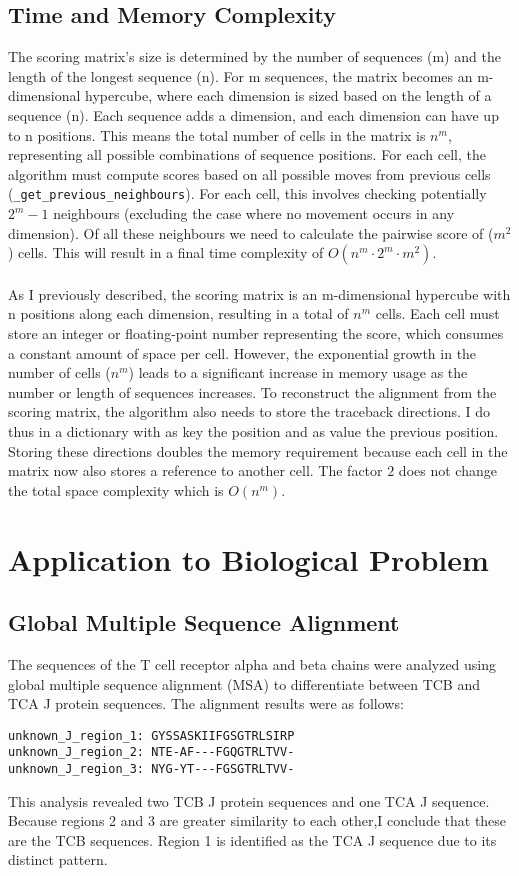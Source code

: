 \documentclass{article}
\begin{document}
\subsection{Time and Memory Complexity}

The scoring matrix's size is determined by the number of sequences (m) and the length of the longest sequence (n). For m sequences, the matrix becomes an m-dimensional hypercube, where each dimension is sized based on the length of a sequence (n). Each sequence adds a dimension, and each dimension can have up to n positions. This means the total number of cells in the matrix is $n^m$, representing all possible combinations of sequence positions. For each cell, the algorithm must compute scores based on all possible moves from previous cells (\texttt{\_get\_previous\_neighbours}). For each cell, this involves checking potentially $2^m-1$ neighbours (excluding the case where no movement occurs in any dimension). Of all these neighbours we need to calculate the pairwise score of ($m^2$) cells. This will result in a final time complexity of $O(n^m \cdot 2^m \cdot m^2)$.\\
\\
As I previously described, the scoring matrix is an m-dimensional hypercube with n positions along each dimension, resulting in a total of $n^m$ cells. Each cell must store an integer or floating-point number representing the score, which consumes a constant amount of space per cell. However, the exponential growth in the number of cells ($n^m$) leads to a significant increase in memory usage as the number or length of sequences increases. To reconstruct the alignment from the scoring matrix, the algorithm also needs to store the traceback directions. I do thus in a dictionary with as key the position and as value the previous position. Storing these directions doubles the memory requirement because each cell in the matrix now also stores a reference to another cell. The factor $2$ does not change the total space complexity which is $O(n^m)$.
\section{Application to Biological Problem}
\subsection{Global Multiple Sequence Alignment}
The sequences of the T cell receptor alpha and beta chains were analyzed using global multiple sequence alignment (MSA) to differentiate between TCB and TCA J protein sequences. The alignment results were as follows:
\begin{verbatim}
unknown_J_region_1: GYSSASKIIFGSGTRLSIRP
unknown_J_region_2: NTE-AF---FGQGTRLTVV-
unknown_J_region_3: NYG-YT---FGSGTRLTVV-
\end{verbatim}
This analysis revealed two TCB J protein sequences and one TCA J sequence. Because regions 2 and 3 are greater similarity to each other,I conclude that these are the TCB sequences. Region 1 is identified as the TCA J sequence due to its distinct pattern.
\end{document}

